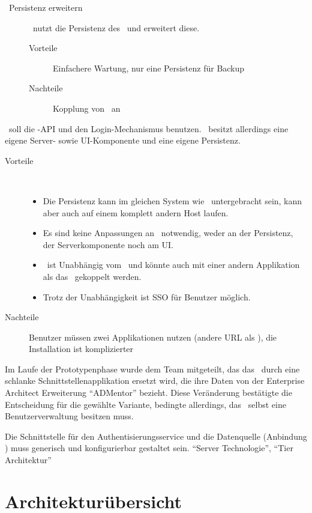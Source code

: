 {{\begin{description}
					\item[\cdar\ Persistenz erweitern]
					\eeppi\ nutzt die Persistenz des \cdar\ und erweitert diese.
					\begin{description}
						\item[Vorteile] Einfachere Wartung, nur eine Persistenz für Backup
						\item[Nachteile] Kopplung von \eeppi\ an \cdar
					\end{description}
				\end{description}
			}
			{
				\eeppi\ soll die \cdar-API und den Login-Mechanismus benutzen. \eeppi\ besitzt allerdings eine eigene Server- sowie UI-Komponente und eine eigene Persistenz. 
				\begin{description}
					\item[Vorteile] \
						\begin{itemize}
							\item Die Persistenz kann im gleichen System wie \cdar\ untergebracht sein, kann aber auch auf einem komplett andern Host laufen.
							\item Es sind keine Anpassungen an \cdar\ notwendig, weder an der Persistenz, der Serverkomponente noch am UI.
							\item \eeppi\ ist Unabhängig vom \cdar\ und könnte auch mit einer andern Applikation als das \cdar\ gekoppelt werden.
							\item Trotz der Unabhängigkeit ist SSO für Benutzer möglich.
						\end{itemize}
					\item[Nachteile] Benutzer müssen zwei Applikationen nutzen (andere URL als \cdar), die Installation ist komplizierter
				\end{description}
				Im Laufe der Prototypenphase wurde dem Team mitgeteilt, 
				das das \cdar\ durch eine schlanke Schnittstellenapplikation ersetzt wird, 
				die ihre Daten von der Enterprise Architect Erweiterung "`ADMentor"' bezieht. 
				Diese Veränderung bestätigte die Entscheidung für die gewählte Variante, 
				bedingte allerdings, das \eeppi\ selbst eine Benutzerverwaltung besitzen muss.
			}
			{}
			{Die Schnittstelle für den Authentisierungsservice und die Datenquelle (Anbindung \cdar) muss generisch und konfigurierbar gestaltet sein.}
			{"`Server Technologie"', "`Tier Architektur"'}
		}
		

	\section{Architekturübersicht}
	
